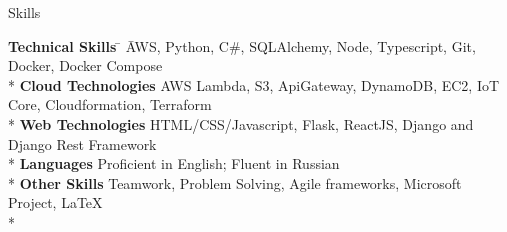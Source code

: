 \documentclass[a4paper]{article}
\newlength{\tabin}
\newlength{\secsep}
\newcommand{\lineunder}{\vspace*{-8pt}\\\hspace*{-6pt}\hrulefill\\\vspace*{-15pt}}
\newenvironment{tabbedsection}[1]{
  \begin{list}{}{
    \setlength{\itemsep}{0pt}
    \setlength{\labelsep}{0pt}
    \setlength{\labelwidth}{0pt}
    \setlength{\leftmargin}{\tabin}
    \setlength{\rightmargin}{\tabin}
    \setlength{\listparindent}{0pt}
    \setlength{\parsep}{0pt}
    \setlength{\parskip}{0pt}
    \setlength{\partopsep}{0pt}
    \setlength{\topsep}{#1}
  }
  \item[]
}{\end{list}}
\newenvironment{nospacetabbing}{\begin{tabbing}}{\end{tabbing}\vspace{-1.2em}}
\newenvironment{resume_section}[1]{
  \filbreak
  \vspace{2\secsep}
  \textsc{\large#1}
  \lineunder
  \begin{tabbedsection}{\secsep}
}{\end{tabbedsection}}
\newenvironment{resume_subsection}[2]{
  \vspace{\secsep}
  \textbf{#1 \hfill #2} \\ \vspace{-10pt}
  \begin{tabbedsection}{0.5\secsep}
}{\end{tabbedsection}}
\newenvironment{subitems}{
  \renewcommand{\labelitemi}{-}
  \begin{itemize}
  \setlength{\labelsep}{1em}
}{\end{itemize}}
\begin{document}




\begin{resume_section}{Skills}
  \begin{nospacetabbing}
    \textbf{Technical Skills} \= \hspace{2em} \= AWS, Python, C\#, SQLAlchemy, Node, Typescript, Git, Docker, Docker Compose\\*
    \textbf{Cloud Technologies} \> \> AWS Lambda, S3, ApiGateway, DynamoDB, EC2, IoT Core, Cloudformation, Terraform\\*
    \textbf{Web Technologies} \> \> HTML/CSS/Javascript, Flask, ReactJS, Django and Django Rest Framework\\*
    \textbf{Languages} \> \> Proficient in English; Fluent in Russian\\*
    \textbf{Other Skills} \> \> Teamwork, Problem Solving, Agile frameworks, Microsoft Project, \LaTeX\\*
  \end{nospacetabbing}
\end{resume_section}
\end{document}
